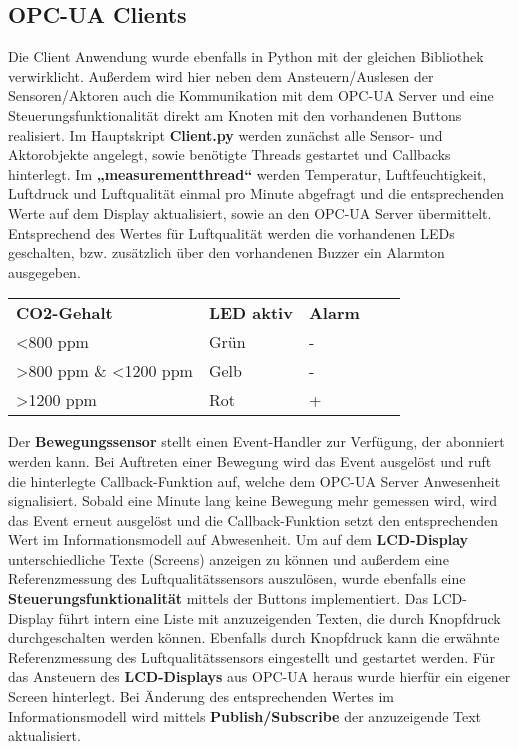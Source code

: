 \subsection{OPC-UA Clients}
\newline Die Client Anwendung wurde ebenfalls in Python mit der gleichen Bibliothek verwirklicht. Außerdem wird hier neben dem Ansteuern/Auslesen der Sensoren/Aktoren auch die Kommunikation mit dem OPC-UA Server und eine Steuerungsfunktionalität direkt am Knoten mit den vorhandenen Buttons realisiert. 
\newline Im Hauptskript \textbf{Client.py} werden zunächst alle Sensor- und Aktorobjekte angelegt, sowie benötigte Threads gestartet und Callbacks hinterlegt. 
\newline Im \textbf{„measurement\textunderscore thread“} werden Temperatur, Luftfeuchtigkeit, Luftdruck und Luftqualität einmal pro Minute abgefragt und die entsprechenden Werte auf dem Display aktualisiert, sowie an den OPC-UA Server übermittelt. Entsprechend des Wertes für Luftqualität werden die vorhandenen LEDs geschalten, bzw. zusätzlich über den vorhandenen Buzzer ein Alarmton ausgegeben.

\begin{table}[]
\centering
\begin{tabular}{|l|l|l|ll}
\cline{1-3}
\textbf{CO2-Gehalt}                        & \textbf{LED aktiv} & \textbf{Alarm} &  &  \\ \cline{1-3}
\textless 800 ppm                          & Grün               & -              &  &  \\ \cline{1-3}
\textgreater 800 ppm \& \textless 1200 ppm & Gelb               & -              &  &  \\ \cline{1-3}
\textgreater 1200 ppm                      & Rot                & +              &  &  \\ \cline{1-3}
\end{tabular}
\end{table}

\newline Der \textbf{Bewegungssensor} stellt einen Event-Handler zur Verfügung, der abonniert werden kann. Bei Auftreten einer Bewegung wird das Event ausgelöst und ruft die hinterlegte Callback-Funktion auf, welche dem OPC-UA Server Anwesenheit signalisiert. Sobald eine Minute lang keine Bewegung mehr gemessen wird, wird das Event erneut ausgelöst und die Callback-Funktion setzt den entsprechenden Wert im Informationsmodell auf Abwesenheit.
\newline Um auf dem \textbf{LCD-Display} unterschiedliche Texte (Screens) anzeigen zu können und außerdem eine Referenzmessung des Luftqualitätssensors auszulösen, wurde ebenfalls eine \textbf{Steuerungsfunktionalität} mittels der Buttons implementiert. Das LCD-Display führt intern eine Liste mit anzuzeigenden Texten, die durch Knopfdruck durchgeschalten werden können. Ebenfalls durch Knopfdruck kann die erwähnte Referenzmessung des Luftqualitätssensors eingestellt und gestartet werden.
\newline Für das Ansteuern des \textbf{LCD-Displays} aus OPC-UA heraus wurde hierfür ein eigener Screen hinterlegt. Bei Änderung des entsprechenden Wertes im Informationsmodell wird mittels \textbf{Publish/Subscribe} der anzuzeigende Text aktualisiert.
